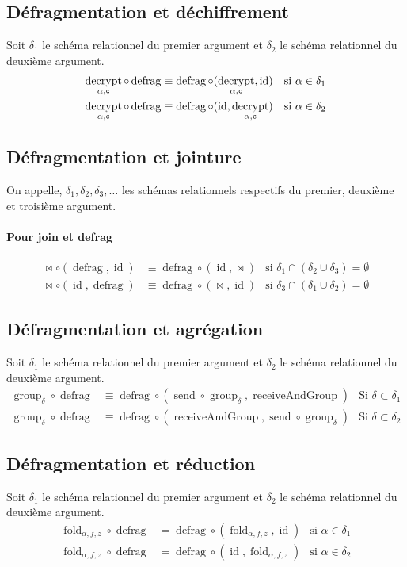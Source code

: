 \documentclass[french]{article}
\DeclareMathOperator{\defrag}{defrag}
\DeclareMathOperator{\decrypt}{decrypt}
\DeclareMathOperator{\group}{group}
\DeclareMathOperator{\id}{id}
\DeclareMathOperator{\send}{send}
\DeclareMathOperator{\rec}{receiveAndGroup}
\newcommand\typeT[1]{\text{\ttfamily #1}}
\newcommand{\decryptArgs}[2]{\decrypt_{#1 , \typeT{#2}}}
\newcommand{\decryptCAlpha}{\decryptArgs{\alpha}{c}}
\newcommand{\groupDelta}{\group_{\delta}}
\newcommand{\fold}[3]{\operatorname{fold}_{#1, #2, #3}}
\newcommand{\foldAlphafz}{\fold{\alpha}{f}{z}}
\newcommand{\args}{Soit $\delta_1$ le schéma relationnel du premier
	argument et $\delta_2$ le schéma relationnel du deuxième
	argument.}
\begin{document}
\subsection*{Défragmentation et déchiffrement}
\args
\begin{align}
\decryptCAlpha \circ \defrag 
& \equiv \defrag \circ (\decryptCAlpha, \id)
& \text{si $\alpha \in \delta_1$} \\
\decryptCAlpha \circ \defrag 
& \equiv \defrag \circ (\id, \decryptCAlpha)
& \text{si $\alpha \in \delta_2$}
\end{align}

\subsection*{Défragmentation et jointure}
On appelle,
$\delta_1, \delta_2, \delta_3, \dots$ 
les schémas relationnels respectifs
du premier, deuxième et troisième argument.

\paragraph{Pour join et defrag} 
\begin{align}
\Join \circ (\defrag, \id)
& \equiv
\defrag \circ (\id, \Join)
& \text{si $\delta_1 \cap (\delta_2 \cup \delta_3) = \emptyset$} \\
\Join \circ (\id, \defrag)
& \equiv
\defrag \circ (\Join, \id)
& \text{si $\delta_3 \cap (\delta_1 \cup \delta_2) = \emptyset$} 
\end{align}

\subsection*{Défragmentation et agrégation}
\args
\begin{align}
\groupDelta \circ \defrag 
& \equiv \defrag \circ (\send\circ\groupDelta, \rec)
& \text{Si $\delta \subset \delta_1$} \\
\groupDelta \circ \defrag 
& \equiv \defrag \circ (\rec, \send\circ\groupDelta)
& \text{Si $\delta \subset \delta_2$} 
\end{align}

\subsection*{Défragmentation et réduction}
\args
\begin{align}
\foldAlphafz \circ \defrag
& = \defrag \circ (\foldAlphafz, \id)
& \text{si $\alpha \in \delta_1$} \\
\foldAlphafz \circ \defrag
& = \defrag \circ (\id, \foldAlphafz)
& \text{si $\alpha \in \delta_2$}
\end{align}
\end{document}
